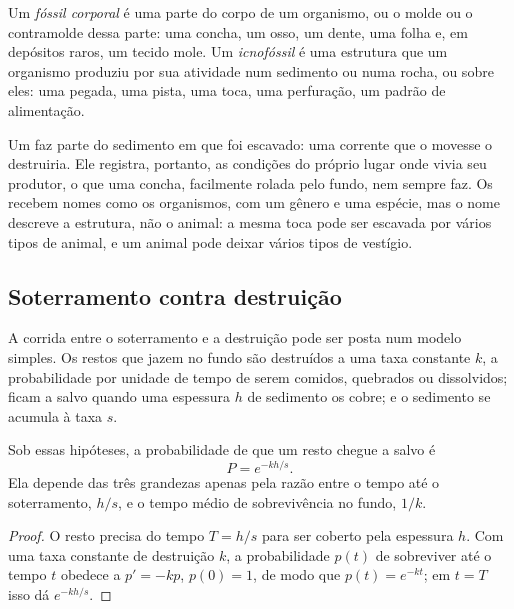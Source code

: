 \begin{definition}\label{def:b2:palaeoenvironments:fossil-kinds}
Um \emph{fóssil corporal} é uma parte do corpo de um organismo, ou o molde ou o contramolde
dessa parte: uma concha, um osso, um dente, uma folha e, em depósitos raros, um tecido mole. Um
\emph{icnofóssil} é uma estrutura que um organismo produziu por sua atividade num
sedimento ou numa rocha, ou sobre eles: uma pegada, uma pista, uma toca, uma perfuração, um padrão de alimentação.
\end{definition}

Um  faz parte do sedimento em que foi escavado: uma corrente que o movesse o destruiria.
Ele registra, portanto, as condições do próprio lugar onde vivia seu produtor, o que uma concha,
facilmente rolada pelo fundo, nem sempre faz. Os  recebem nomes como os organismos, com um
gênero e uma espécie, mas o nome descreve a estrutura, não o animal: a mesma toca pode ser
escavada por vários tipos de animal, e um animal pode deixar vários tipos de vestígio.

\subsection*{Soterramento contra destruição}

A corrida entre o soterramento e a destruição pode ser posta num modelo simples. Os restos que jazem no
fundo são destruídos a uma taxa constante $k$, a probabilidade por unidade de tempo de serem comidos,
quebrados ou dissolvidos; ficam a salvo quando uma espessura $h$ de sedimento os cobre; e o
sedimento se acumula à taxa $s$.

\begin{proposition}\label{prop:b2:palaeoenvironments:burial}
Sob essas hipóteses, a probabilidade de que um resto chegue a salvo é
\[
  P = e^{-kh/s}.
\]
Ela depende das três grandezas apenas pela razão entre o tempo até o soterramento, $h/s$, e o
tempo médio de sobrevivência no fundo, $1/k$.
\end{proposition}

\begin{proof}
O resto precisa do tempo $T = h/s$ para ser coberto pela espessura $h$. Com uma taxa constante de
destruição $k$, a probabilidade $p(t)$ de sobreviver até o tempo $t$ obedece a $p' = -kp$, $p(0) =
1$, de modo que $p(t) = e^{-kt}$; em $t = T$ isso dá $e^{-kh/s}$.
\end{proof}

